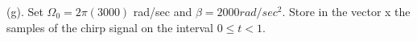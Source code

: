 (g). Set $\Omega_0 = 2\pi(3000)$ rad/sec and $\beta = 2000 rad/sec^2 $. Store in the vector x the samples of the chirp signal on the interval $0 \le t <1$.
